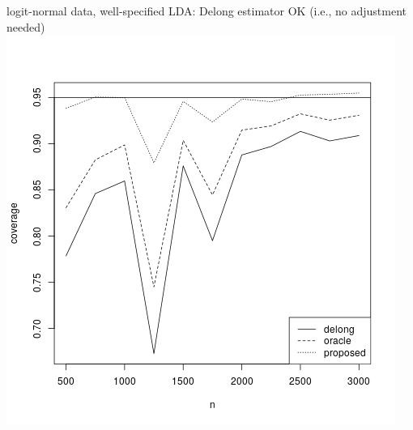 \documentclass{beamer}
\begin{document}
\begin{frame}
logit-normal data, well-specified LDA: Delong estimator OK (i.e., no adjustment needed)
\includegraphics[scale=.45]{../sim/lda/sim_logit}
\end{frame}
\end{document}
